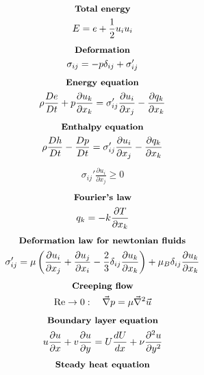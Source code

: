 \documentclass[10pt, a4paper]{article}
\newcommand{\derivative}[2]{\frac{\partial #1}{\partial #2}}
\begin{document}
\begin{multicols*}{2}
    \begin{gather*}
        \textbf{\small Total energy} \\
        E = e + \frac12 u_i u_i
    \end{gather*}
    \begin{gather*}
        \textbf{\small Deformation} \\
        \sigma_{ij} = -p \delta_{ij} + \sigma_{ij}'
    \end{gather*}
    \begin{gather*}
        \textbf{\small Energy equation} \\
        \rho \frac{De}{Dt} + p\derivative{ u_k}{x_k} =
        \sigma_{ij}' \derivative{ u_i}{x_j}  - \derivative{ q_k}{x_k}
    \end{gather*}
    \begin{gather*}
        \textbf{\small Enthalpy equation} \\
        \rho \frac{Dh}{Dt} - \frac{Dp}{Dt} =
        \sigma_{ij}' \derivative{ u_i}{x_j}  - \derivative{ q_k}{x_k}
    \end{gather*}
    \begin{gather*}
        \sigma_{ij}' \derivative{ u_i}{x_j} \geq 0
    \end{gather*}
    \begin{gather*}
        \textbf{\small Fourier's law} \\
        q_k = -k\derivative{ T}{x_k}
    \end{gather*}
    \begin{gather*}
        \textbf{\small Deformation law for newtonian fluids} \\
        \sigma_{ij}' = \mu \left( \derivative{ u_i}{x_j} + \derivative{ u_j}{x_i}
        - \frac23\delta_{ij}\derivative{ u_k}{x_k} \right) + \mu_B\delta_{ij}\derivative{ u_k}{x_k}
    \end{gather*}
    \begin{gather*}
        \textbf{\small Creeping flow} \\
        \text{Re} \rightarrow 0: \quad \vec{\nabla}p = \mu \vec{\nabla}^2 \vec{u}
    \end{gather*}
    \begin{gather*}
        \textbf{\small Boundary layer equation} \\
        u\derivative{ u}{x} + v \derivative{ u}{y} =
        U \frac{dU}{dx} + \nu \derivative{^2 u}{y^2}
    \end{gather*}
    \begin{gather*}
        \textbf{\small Steady heat equation} \\

\end{gather*}
\end{multicols*}
\end{document}
